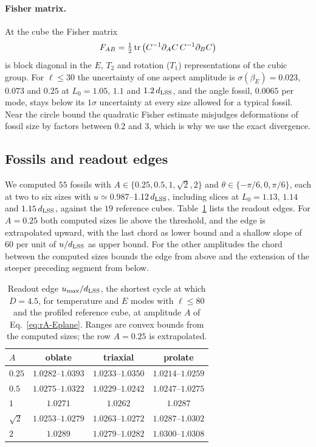 \paragraph{Fisher matrix.}
At the cube the Fisher matrix
\begin{equation}
F_{AB}=\tfrac12\operatorname{tr}\big(C^{-1}\partial_AC\,C^{-1}\partial_BC\big)
\label{eq:rA-fisher}
\end{equation}
is block diagonal in the $E$, $T_2$ and rotation ($T_1$) representations of the cubic group.
For $\ell\leq30$ the uncertainty of one aspect amplitude is $\sigma(\beta_E)=0.023$, $0.073$ and $0.25$ at $L_0=1.05$, $1.1$ and $1.2\,d_{\mathrm{LSS}}$, and the angle fossil, $0.0065$ per mode, stays below its $1\sigma$ uncertainty at every size allowed for a typical fossil. %
Near the circle bound the quadratic Fisher estimate misjudges deformations of fossil size by factors between $0.2$ and $3$, which is why we use the exact divergence. %

\subsection{Fossils and readout edges}
\label{rA:c-edges}

We computed $55$ fossils with $A\in\{0.25,0.5,1,\sqrt2,2\}$ and $\theta\in\{-\pi/6,0,\pi/6\}$, each at two to six sizes with $u\simeq0.987$--$1.12\,d_{\mathrm{LSS}}$, including slices at $L_0=1.13$, $1.14$ and $1.15\,d_{\mathrm{LSS}}$, against the $19$ reference cubes. %
Table~\ref{tab:rA-edges} lists the readout edges.
For $A=0.25$ both computed sizes lie above the threshold, and the edge is extrapolated upward, with the last chord as lower bound and a shallow slope of $60$ per unit of $u/d_{\mathrm{LSS}}$ as upper bound. %
For the other amplitudes the chord between the computed sizes bounds the edge from above and the extension of the steeper preceding segment from below.

\begin{table}[tbp]
\centering
\caption{Readout edge $u_{\max}/d_{\mathrm{LSS}}$, the shortest cycle at which $D=4.5$, for temperature and $E$ modes with $\ell\leq80$ and the profiled reference cube, at amplitude $A$ of Eq.~\eqref{eq:rA-Eplane}. Ranges are convex bounds from the computed sizes; the row $A=0.25$ is extrapolated.}
\label{tab:rA-edges}
\begin{tabular}{lccc}
\toprule
$A$ & oblate & triaxial & prolate\\
\midrule
$0.25$ & $1.0282$--$1.0393$ & $1.0233$--$1.0350$ & $1.0214$--$1.0259$\\ %
$0.5$ & $1.0275$--$1.0322$ & $1.0229$--$1.0242$ & $1.0247$--$1.0275$\\ %
$1$ & $1.0271$ & $1.0262$ & $1.0287$\\ %
$\sqrt2$ & $1.0253$--$1.0279$ & $1.0263$--$1.0272$ & $1.0287$--$1.0302$\\ %
$2$ & $1.0289$ & $1.0279$--$1.0282$ & $1.0300$--$1.0308$\\ %
\bottomrule
\end{tabular}
\end{table}

